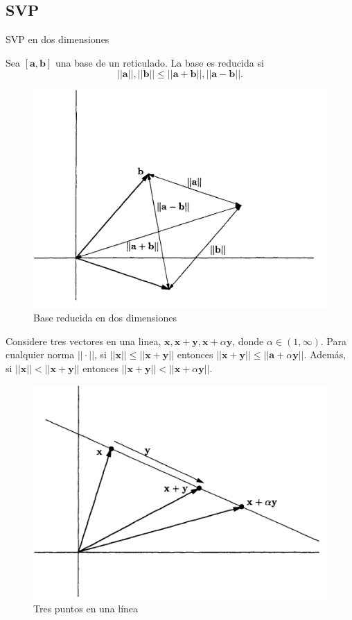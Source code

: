 \subsection{SVP}
\begin{frame}{SVP en dos dimensiones}
    \begin{definition}
        Sea $[\textbf{a},\textbf{b}]$ una base de un reticulado. La base es reducida si
        \[
            ||\textbf{a}||,||\textbf{b}|| \leq ||\textbf{a}+\textbf{b}||,||\textbf{a}-\textbf{b}|| \text{.}
        \]
        \begin{figure}
            \centering
            \includegraphics[width=0.5\linewidth]{figures/baseReducida.png}
            \caption{Base reducida en dos dimensiones}
        \end{figure}
    \end{definition}
\end{frame}

\begin{frame}
    \begin{lemma}
        Considere tres vectores en una linea, $\textbf{x}, \textbf{x}+\textbf{y}, \textbf{x}+\textbf{$\alpha$} \textbf{y}$, donde $\alpha \in (1, \infty)$. Para cualquier norma $||\cdot||$, si $||\textbf{x}|| \leq ||\textbf{x}+\textbf{y}||$ entonces $||\textbf{x}+\textbf{y}|| \leq ||\textbf{a}+\alpha \textbf{y}||$. Además, si $||\textbf{x}||<||\textbf{x}+\textbf{y}||$ entonces $||\textbf{x}+\textbf{y}||<||\textbf{x}+\alpha \textbf{y}||$.
    \end{lemma}
    \begin{figure}
        \centering
        \includegraphics[width=0.45\linewidth]{figures/lattice_pointsLine.png}
        \caption{Tres puntos en una línea}
    \end{figure}
\end{frame}

